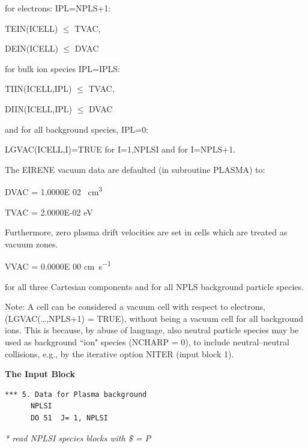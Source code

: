 for electrons: IPL=NPLS+1:

TEIN(ICELL) $\le$ TVAC, 

DEIN(ICELL) $\le$ DVAC 

for bulk ion species IPL=IPLS:

TIIN(ICELL,IPL) $\le$ TVAC, 

DIIN(ICELL,IPL) $\le$ DVAC 

and for all background species, IPL=0:

LGVAC(ICELL,I)=TRUE for I=1,NPLSI and for I=NPLS+1.

The EIRENE vacuum data are defaulted (in subroutine PLASMA) to:

DVAC = 1.0000E 02 \si{\per\cubic\centi\metre} 

TVAC = 2.0000E-02 \si{\electronvolt} 

Furthermore, zero plasma drift velocities are set in cells which are treated as
vacuum zones.

VVAC = 0.0000E 00  \si{\centi\metre\per\second} 

for all three Cartesian components and for all NPLS background particle
species.

Note: A cell can be considered a vacuum cell with respect to electrons,
(LGVAC(\dots,NPLS+1) = TRUE), without being a vacuum cell for all background
ions.
This is because, by abuse of language, also neutral particle species may be
used as background ``ion" species (NCHARP = 0), to include neutral--neutral
collisions, e.g., by the iterative option NITER (input block 1).

\medskip

\textbf{The Input Block} 

\begin{lstlisting}
*** 5. Data for Plasma background
      NPLSI
      DO 51  J= 1, NPLSI
\end{lstlisting} 

\textsl{* read NPLSI species blocks with \$ = P} 

